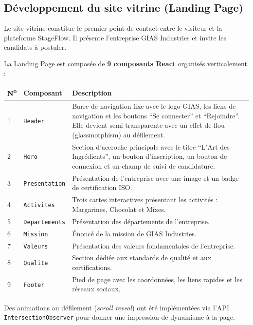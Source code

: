 \subsection{Développement du site vitrine (Landing Page)}
Le site vitrine constitue le premier point de contact entre le visiteur et la plateforme StageFlow. Il présente l'entreprise GIAS Industries et invite les candidats à postuler.

La Landing Page est composée de \textbf{9 composants React} organisés verticalement :

\begin{center}
\begin{tabular}{|p{1cm}|l|p{8cm}|}
\hline
\textbf{N\textsuperscript{o}} & \textbf{Composant} & \textbf{Description} \\ \hline
1 & \texttt{Header} & Barre de navigation fixe avec le logo GIAS, les liens de navigation et les boutons ``Se connecter'' et ``Rejoindre''. Elle devient semi-transparente avec un effet de flou (glassmorphism) au défilement. \\ \hline
2 & \texttt{Hero} & Section d'accroche principale avec le titre ``L'Art des Ingrédients'', un bouton d'inscription, un bouton de connexion et un champ de suivi de candidature. \\ \hline
3 & \texttt{Presentation} & Présentation de l'entreprise avec une image et un badge de certification ISO. \\ \hline
4 & \texttt{Activites} & Trois cartes interactives présentant les activités : Margarines, Chocolat et Mixes. \\ \hline
5 & \texttt{Departements} & Présentation des départements de l'entreprise. \\ \hline
6 & \texttt{Mission} & Énoncé de la mission de GIAS Industries. \\ \hline
7 & \texttt{Valeurs} & Présentation des valeurs fondamentales de l'entreprise. \\ \hline
8 & \texttt{Qualite} & Section dédiée aux standards de qualité et aux certifications. \\ \hline
9 & \texttt{Footer} & Pied de page avec les coordonnées, les liens rapides et les réseaux sociaux. \\ \hline
\end{tabular}
\end{center}

Des animations au défilement (\textit{scroll reveal}) ont été implémentées via l'API \texttt{IntersectionObserver} pour donner une impression de dynamisme à la page.

